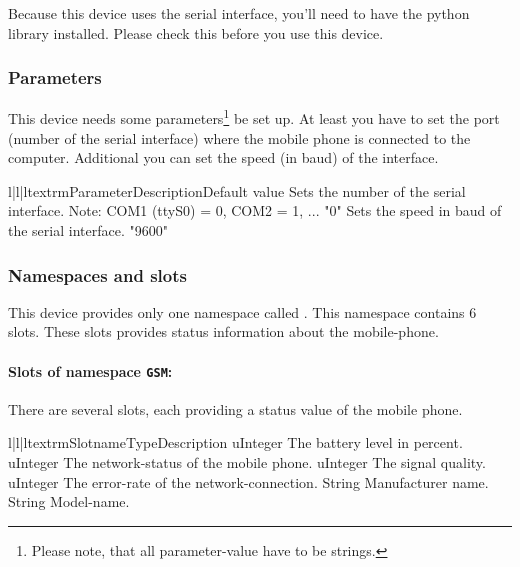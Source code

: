 \begin{notice}
Because this device uses the serial interface, you'll need to have the 
 python library installed. Please check this before you use 
this device.
\end{notice}

\subsubsection{Parameters}
This device needs some parameters\footnote{Please note, that all 
parameter-value have to be strings.} be set up. At least you have to set 
the port (number of the serial interface) where the mobile phone is connected 
to the computer. Additional you can set the speed (in baud) of the interface.
\begin{tableiii}{l|l|l}{textrm}{Parameter}{Description}{Default value}
        {Sets the number of the serial interface. Note: COM1 (ttyS0) = 0, 
        COM2 = 1, ...} 
        {"0"}
        {Sets the speed in baud of the serial interface.}
        {"9600"}
\end{tableiii}

\subsubsection{Namespaces and slots}
This device provides only one namespace called . This namespace
contains 6 slots. These slots provides status information about the 
mobile-phone.

\paragraph{Slots of namespace \texttt{GSM}:}
There are several slots, each providing a status value of the mobile phone.
\begin{tableiii}{l|l|l}{textrm}{Slotname}{Type}{Description}
        {uInteger}
        {The battery level in percent.}
        {uInteger}
        {The network-status of the mobile phone.}
        {uInteger}
        {The signal quality.}
        {uInteger}
        {The error-rate of the network-connection.}
        {String}
        {Manufacturer name.}
        {String}
        {Model-name.}
\end{tableiii}


